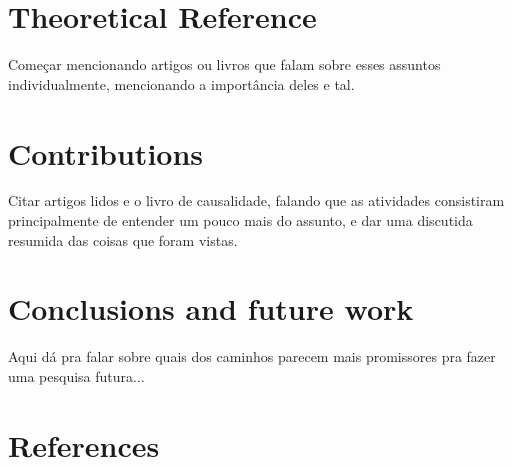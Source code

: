 \documentclass{article}
\begin{document}


\section{Theoretical Reference}\label{sec:theoRef}

{\color{red} Começar mencionando artigos ou livros que falam sobre esses assuntos individualmente, mencionando a importância deles e tal.}



\section{Contributions}\label{sec:contribs}

{\color{red} Citar artigos lidos e o livro de causalidade, falando que as atividades consistiram principalmente de entender um pouco mais do assunto, e dar uma discutida resumida das coisas que foram vistas.}

\section{Conclusions and future work}\label{sec:concsFuture}

{\color{red} Aqui dá pra falar sobre quais dos caminhos parecem mais promissores pra fazer uma pesquisa futura...}

\section{References}




\end{document}
